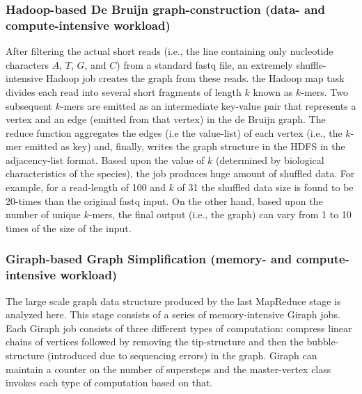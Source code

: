 \documentclass[journal]{IEEEtran}
\begin{document}
\subsubsection {Hadoop-based De Bruijn graph-construction (data- and compute-intensive workload)}
After filtering the actual short reads (i.e., the line containing only nucleotide characters $A$, $T$, $G$, and $C$) from a standard fastq file, an extremely shuffle-intensive Hadoop job creates the graph from these reads.  the Hadoop map task divides each read into several short fragments of length $k$ known as $k$-mers. Two subsequent $k$-mers are emitted as an intermediate key-value pair that represents  a vertex and an edge (emitted from that vertex) in the de Bruijn graph.  The reduce function aggregates the edges (i.e the value-list) of each vertex (i.e., the $k$-mer emitted as key) and, finally, writes the graph structure in the HDFS in the adjacency-list format. Based upon the value of $k$ (determined by biological characteristics of the species), the job produces huge amount of shuffled data. For example, for a read-length of 100 and $k$ of 31 the shuffled data size is found to be 20-times than the original fastq input. On the other hand, based upon the number of unique $k$-mers, the final output (i.e., the graph) can vary from 1 to 10 times of the size of the input. 

\subsubsection {Giraph-based Graph Simplification (memory- and compute-intensive workload)}
The large scale graph data structure produced by the last MapReduce stage is analyzed here. This stage consists of a series of memory-intensive Giraph jobs. Each Giraph job consists of three different types of computation: compress linear chains of vertices followed by removing the tip-structure and then the bubble-structure (introduced due to sequencing errors) in the graph. Giraph can maintain a counter on the number of supersteps and the master-vertex class invokes each type of computation based on that.  
\end{document}
